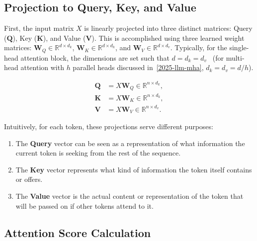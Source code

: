 \documentclass[%
  reprint,
  superscriptaddress,
  showpacs,
  showkeys,
  amsmath,amssymb,
  pra,
  longbibliography,
  floatfix,
  x11names
]{revtex4-2}
\begin{document}
\subsection{Projection to Query, Key, and Value}

First, the input matrix $X$ is linearly projected into three distinct matrices:
Query ($\bm{Q}$), Key ($\bm{K}$), and Value ($\bm{V}$).
This is accomplished using three learned weight matrices:
$\bm{W}_Q \in \mathbb{R}^{d \times d_k}$, $\bm{W}_K \in \mathbb{R}^{d \times d_k}$, and $\bm{W}_V \in \mathbb{R}^{d \times d_v}$.
Typically, for the single-head attention block, the dimensions are set such that $d=d_k = d_v$~\cite{Vaswani-2017-Attention}
(for multi-head attention with $h$ parallel heads discussed in~\ref{2025-llm-mha}, $d_k = d_v = d / h$).

\begin{align}
    \bm{Q} &= X \bm{W}_Q \in \mathbb{R}^{n \times d_k}, \\
    \bm{K} &= X \bm{W}_K \in \mathbb{R}^{n \times d_k}, \\
    \bm{V} &= X \bm{W}_V \in \mathbb{R}^{n \times d_v}.
\end{align}

Intuitively, for each token, these projections serve different purposes:
\begin{enumerate}
    \item The \textbf{Query} vector can be seen as a representation of what information the current token is seeking from the rest of the sequence.
    \item The \textbf{Key} vector represents what kind of information the token itself contains or offers.
    \item The \textbf{Value} vector is the actual content or representation of the token that will be passed on if other tokens attend to it.
\end{enumerate}

\subsection{Attention Score Calculation}
\end{document}
